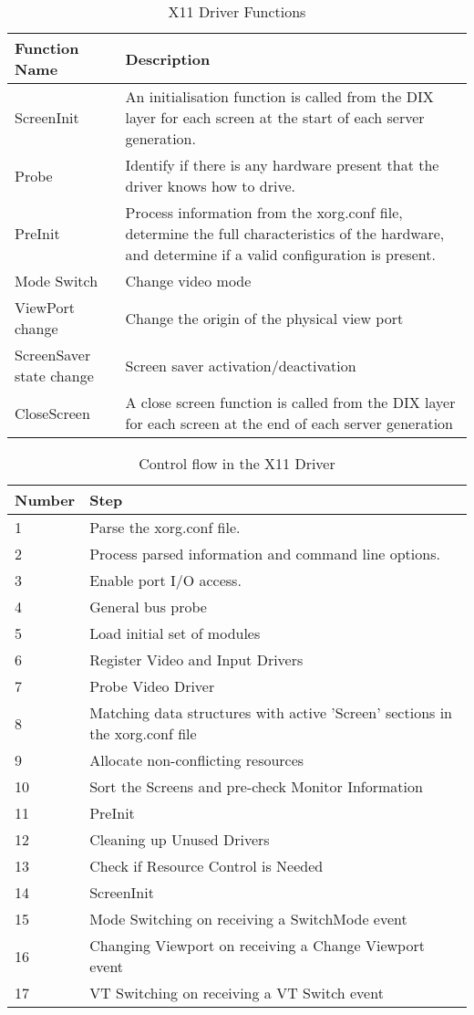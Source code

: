 \documentclass{acm_proc_article-sp}
\begin{document}
\begin{table}
 \centering
  \caption{X11 Driver Functions}
  \begin{tabular}{|l|p{4cm}|} \hline
  \textbf{Function Name}&\textbf{Description}\\ \hline
  ScreenInit & An initialisation function is called from the DIX layer for each screen at the start of each server generation.\\ \hline
  Probe & Identify if there is any hardware present that the driver knows how to drive.\\ \hline
  PreInit & Process information from the xorg.conf file, determine the full characteristics of the hardware, and determine if a valid configuration is present. \\ \hline
  Mode Switch & Change video mode \\ \hline
  ViewPort change & Change the origin of the physical view port \\ \hline
  ScreenSaver state change & Screen saver activation/deactivation \\ \hline
  CloseScreen & A close screen function is called from the DIX layer for each screen at the end of each server generation \\ \hline
\end{tabular}
\end{table}

\begin{table}
 \centering
  \caption{Control flow in the X11 Driver }
  \begin{tabular}{|l|p{4cm}|} \hline
  \textbf{Number}&\textbf{Step}\\ \hline
  1 & Parse the xorg.conf file.\\ \hline
  2 & Process parsed information and command line options.\\ \hline
  3 & Enable port I/O access. \\ \hline
  4 & General bus probe \\ \hline
  5 & Load initial set of modules \\ \hline
  6 & Register Video and Input Drivers  \\ \hline
  7 & Probe Video Driver\\ \hline
  8 & Matching data structures with active 'Screen' sections in the xorg.conf file\\ \hline
  9 & Allocate non-conflicting resources\\ \hline
  10 & Sort the Screens and pre-check Monitor Information\\ \hline
  11 & PreInit\\ \hline
  12 & Cleaning up Unused Drivers\\ \hline
  13 & Check if Resource Control is Needed\\ \hline
  14 & ScreenInit\\ \hline       
  15 & Mode Switching on receiving a SwitchMode event\\ \hline
  16 & Changing Viewport on receiving a Change Viewport event\\ \hline
  17 & VT Switching on receiving a VT Switch event\\ \hline
\end{tabular}
\end{table}
\end{document}
